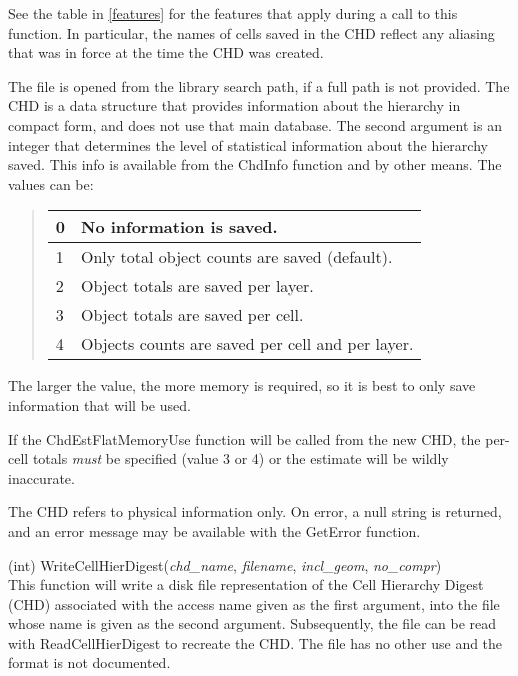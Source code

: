 \begin{description}
See the table in \ref{features} for the features that apply during a
call to this function.  In particular, the names of cells saved in the
CHD reflect any aliasing that was in force at the time the CHD was
created.

The file is opened from the library search path, if a full path is not
provided.  The CHD is a data structure that provides information about
the hierarchy in compact form, and does not use that main database. 
The second argument is an integer that determines the level of
statistical information about the hierarchy saved.  This info is
available from the {\vt ChdInfo} function and by other means.  The
values can be:

\begin{quote}
\begin{tabular}{|l|l|} \hline
0 & No information is saved.\\ \hline
1 & Only total object counts are saved (default).\\ \hline
2 & Object totals are saved per layer.\\ \hline
3 & Object totals are saved per cell.\\ \hline
4 & Objects counts are saved per cell and per layer.\\ \hline
\end{tabular}
\end{quote}

The larger the value, the more memory is required, so it is best to
only save information that will be used.

If the {\vt ChdEstFlatMemoryUse} function will be called from the new
CHD, the per-cell totals {\it must} be specified (value 3 or 4) or the
estimate will be wildly inaccurate.

The CHD refers to physical information only.  On error, a null string
is returned, and an error message may be available with the {\vt
GetError} function.

\item{(int) \vt WriteCellHierDigest({\it chd\_name\/}, {\it filename\/},
 {\it incl\_geom\/}, {\it no\_compr\/})}\\
This function will write a disk file representation of the Cell
Hierarchy Digest (CHD) associated with the access name given as the
first argument, into the file whose name is given as the second
argument.  Subsequently, the file can be read with {\vt
ReadCellHierDigest} to recreate the CHD.  The file has no other
use and the format is not documented.


\end{description}
